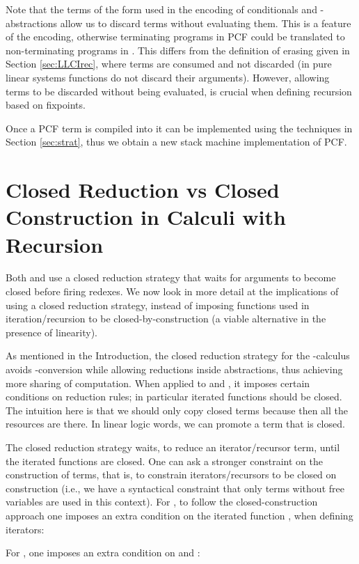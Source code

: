 \documentclass{article}
\begin{document}
Note that the terms of the form  used
in the encoding of conditionals and -abstractions allow us to
discard terms without evaluating them.  This is a feature of the
encoding, otherwise terminating programs in PCF could be translated to
non-terminating programs in \LLCIrec. This differs from the definition
of erasing given in Section \ref{sec:LLCIrec}, where terms are
consumed and not discarded (in pure linear systems functions do not
discard their arguments). However, allowing terms to be discarded
without being evaluated, is crucial when defining recursion based on
fixpoints.

Once a PCF term is compiled into  it can be implemented using the
techniques in Section \ref{sec:strat}, thus we obtain a new stack
machine implementation of PCF.

\section{Closed Reduction vs Closed Construction in Calculi with Recursion}\label{sec:WRS11}
Both \LLCI and \LLCIrec use a closed reduction strategy that waits for
arguments to become closed before firing redexes. We now look in more
detail at the implications of using a closed reduction strategy,
instead of imposing functions used in iteration/recursion to be
closed-by-construction (a viable alternative in the presence of
linearity).

As mentioned in the Introduction, the closed reduction strategy for
the -calculus avoids -conversion while allowing
reductions inside abstractions, thus achieving more sharing of
computation.  When applied to \LLCI and \LLCIrec, it imposes certain
conditions on reduction rules; in particular iterated functions should
be closed. The intuition here is that we should only copy closed terms
because then all the resources are there. In linear logic words, we
can promote a term that is closed.



The closed reduction strategy waits, to reduce an iterator/recursor
term, until the iterated functions are closed. One can ask a stronger
constraint on the construction of terms, that is, to constrain
iterators/recursors to be closed on construction (i.e., we have a
syntactical constraint that only terms without free variables are used
in this context).  For \LLCI, to follow the closed-construction approach
one imposes an extra condition on the
iterated function , when defining iterators:

For \LLCIrec, one imposes an extra condition on  and :
\end{document}
